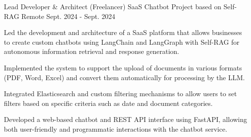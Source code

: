 
\begin{cventries}

  \cventry
    {Lead Developer \& Architect (Freelancer)} %
    {SaaS Chatbot Project based on Self-RAG} %
    {Remote} %
    {Sept. 2024 - Sept. 2024} %
    {
      \begin{cvitems} %
        \item {Led the development and architecture of a SaaS platform that allows businesses to create custom chatbots using LangChain and LangGraph with Self-RAG for autonomous information retrieval and response generation.}
        \item {Implemented the system to support the upload of documents in various formats (PDF, Word, Excel) and convert them automatically for processing by the LLM.}
        \item {Integrated Elasticsearch and custom filtering mechanisms to allow users to set filters based on specific criteria such as date and document categories.}
        \item {Developed a web-based chatbot and REST API interface using FastAPI, allowing both user-friendly and programmatic interactions with the chatbot service.}
      \end{cvitems}
    }

\end{cventries}
